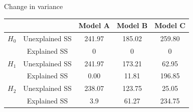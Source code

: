 \documentclass[xcolor=x11names,compress]{beamer}
\renewcommand{\(}{\begin{columns}}
\renewcommand{\)}{\end{columns}}
\newcommand{\<}[1]{\begin{column}{#1}}
\renewcommand{\>}{\end{column}}
\begin{document}

\begin{frame}{Change in variance}

\begin{table}[htdp]
	\begin{center}
		\begin{tabular}{ccccc}
				&  & Model A & Model B & Model C \\
		\hline
		$H_0 $ & Unexplained SS & 241.97 & 185.02 & 259.80 \\
		       & Explained SS   & 0      & 0      &    0   \\
		$H_1 $ & Unexplained SS & 241.97 & 173.21 & 62.95 \\
		       & Explained SS   & 0.00  & 11.81 & 196.85 \\
		$H_2 $ & Unexplained SS & 238.07 & 123.75 & 25.05 \\
		       & Explained SS   & 3.9  & 61.27 & 234.75 \\
		\end{tabular}
	\end{center}
\end{table}

\end{frame}

	

	
\end{document}
